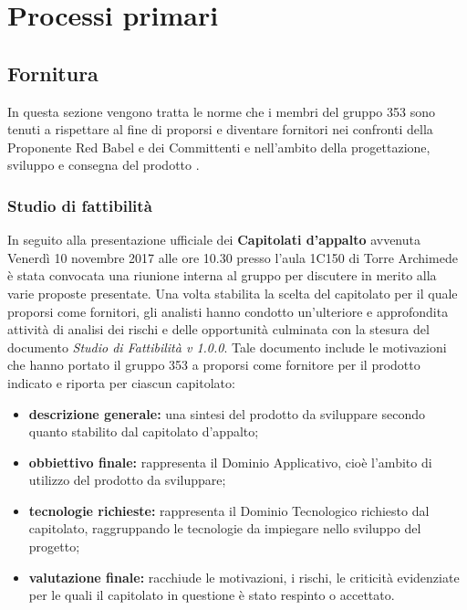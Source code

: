 \documentclass[NormeDiProgetto.tex]{subfiles}
\begin{document}
\chapter{Processi primari}
\section{Fornitura}
In questa sezione vengono tratta le norme che i membri del gruppo 353 sono tenuti a rispettare al fine di proporsi e diventare fornitori nei confronti della Proponente Red Babel e dei Committenti \Vardanega{} e \Cardin{} nell'ambito della progettazione, sviluppo e consegna del prodotto \progetto.

\subsection{Studio di fattibilità}
In seguito alla presentazione ufficiale dei \textbf{Capitolati d'appalto} avvenuta Venerdì 10 novembre 2017 alle ore 10.30 presso l'aula 1C150 di Torre Archimede è stata convocata una riunione interna al gruppo per discutere in merito alla varie proposte presentate. Una volta stabilita la scelta del capitolato per il quale proporsi come fornitori, gli analisti hanno condotto un'ulteriore e approfondita attività di analisi dei rischi e delle opportunità culminata con la stesura del documento \textit{Studio di Fattibilità v 1.0.0}. Tale documento include le motivazioni che hanno portato il gruppo 353 a proporsi come fornitore per il prodotto indicato e riporta per ciascun capitolato:
\begin{itemize}
	\item \textbf{descrizione generale:} una sintesi del prodotto da sviluppare secondo quanto stabilito dal capitolato d'appalto;
	\item \textbf{obbiettivo finale:} rappresenta il Dominio Applicativo, cioè l'ambito di utilizzo del prodotto da sviluppare;
	\item \textbf{tecnologie richieste:} rappresenta il Dominio Tecnologico richiesto dal capitolato, raggruppando le tecnologie da impiegare nello sviluppo del progetto;
	\item \textbf{valutazione finale:} racchiude le motivazioni, i rischi, le criticità evidenziate per le quali il capitolato in questione è stato respinto o accettato.
\end{itemize}
\end{document}

